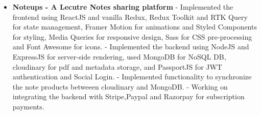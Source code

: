 \documentclass{article}
\begin{document}
\begin{itemize}
    \item{\textbf{\large{Noteups - A Lecutre Notes sharing platform}}}
          \newline
          \textmd{- Implemented the frontend using ReactJS and vanilla Redux, Redux Toolkit and RTK Query for state management, Framer Motion for animations and Styled Components for styling, Media Queries for responsive design, Sass for CSS pre-processing and Font Awesome for icons.}
          \newline
          \textmd{- Implemented the backend using NodeJS and ExpressJS for server-side rendering, used MongoDB for NoSQL DB, cloudinary for pdf and metadata storage, and PassportJS for JWT authentication and Social Login.}
          \newline
          \textmd{- Implemented functionality to synchronize the note products betweeen cloudinary and MongoDB.}
          \newline
          \textmd{- Working on integrating the backend with Stripe,Paypal and Razorpay for subscription payments.}




\end{itemize}
\end{document}
